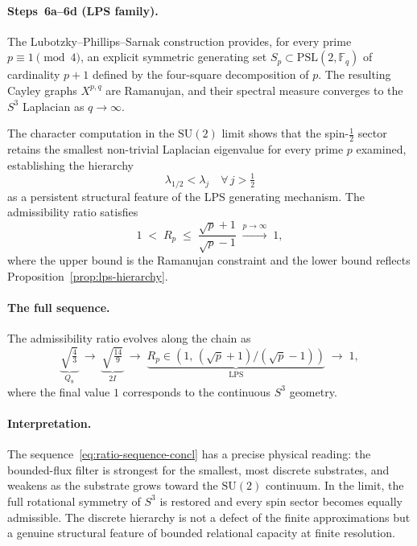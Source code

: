   \paragraph{Steps~6a--6d (LPS family).}
    The Lubotzky--Phillips--Sarnak construction provides, for every prime
    $p \equiv 1 \pmod 4$, an explicit symmetric generating set $S_p \subset
\mathrm{PSL}(2,\mathbb{F}_q)$ of cardinality $p+1$ defined by the
    four-square decomposition of $p$.
    The resulting Cayley graphs $X^{p,q}$ are Ramanujan, and their spectral
    measure converges to the $S^3$ Laplacian as $q \to \infty$.

    The character computation in the $\mathrm{SU}(2)$ limit shows that the
    spin-$\tfrac{1}{2}$ sector retains the smallest non-trivial Laplacian
    eigenvalue for every prime $p$ examined, establishing the hierarchy
    \begin{equation}
      \lambda_{1/2} < \lambda_j \quad \forall\, j > \tfrac{1}{2}
      \label{eq:lps-hierarchy-concl}
    \end{equation}
    as a persistent structural feature of the LPS generating mechanism.
    The admissibility ratio satisfies
    \begin{equation}
      1 \;<\; R_p \;\leq\; \frac{\sqrt{p}+1}{\sqrt{p}-1}
      \;\xrightarrow{p\to\infty}\; 1,
      \label{eq:Rp-concl}
    \end{equation}
    where the upper bound is the Ramanujan constraint and the lower bound
    reflects Proposition~\ref{prop:lps-hierarchy}.

  \paragraph{The full sequence.}
    The admissibility ratio evolves along the chain as
    \begin{equation}
      \underbrace{\sqrt{\tfrac{4}{3}}}_{\displaystyle Q_8}
      \;\longrightarrow\;
      \underbrace{\sqrt{\tfrac{14}{9}}}_{\displaystyle 2I}
      \;\longrightarrow\;
      \underbrace{R_p \in (1,\,(\sqrt{p}+1)/(\sqrt{p}-1))}_{\displaystyle
      \mathrm{LPS}}
      \;\longrightarrow\;
      1,
      \label{eq:ratio-sequence-concl}
    \end{equation}
    where the final value $1$ corresponds to the continuous $S^3$ geometry.

  \paragraph{Interpretation.}
    The sequence~\eqref{eq:ratio-sequence-concl} has a precise physical
    reading: the bounded-flux filter is strongest for the smallest,
    most discrete substrates, and weakens as the substrate grows toward the
    $\mathrm{SU}(2)$ continuum.
    In the limit, the full rotational symmetry of $S^3$ is restored and
    every spin sector becomes equally admissible.
    The discrete hierarchy is not a defect of the finite approximations
    but a genuine structural feature of bounded relational capacity at
    finite resolution.

